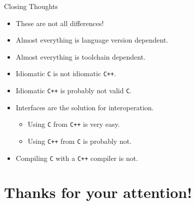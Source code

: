 \documentclass[presentation,aspectratio=169]{beamer}
\begin{document}
\begin{frame}[fragile,label={sec:org23c6824}]{Closing Thoughts}
  \begin{itemize}
  \item These are not all differences!
  \item Almost everything is language version dependent.
  \item Almost everything is toolchain dependent.
  \item Idiomatic \texttt{C} is not idiomatic \texttt{C++}.
  \item Idiomatic \texttt{C++} is probably not valid \texttt{C}.
  \item Interfaces are the solution for interoperation.
    \begin{itemize}
    \item Using \texttt{C} from \texttt{C++} is very easy.
    \item Using \texttt{C++} from \texttt{C} is probably not.
    \end{itemize}
  \item Compiling \texttt{C} with a \texttt{C++} compiler is not.
  \end{itemize}
\end{frame}



\section{Thanks for your attention!}
\label{sec:org6df872a}
\end{document}
